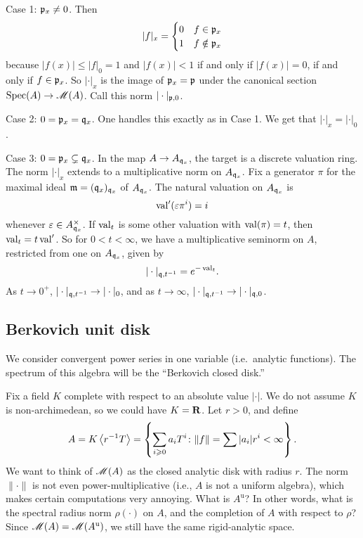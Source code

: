 Case 1: $\mathfrak{p}_x\ne 0$. Then
\[
	|f| _x= \begin{cases} 0 & f\in \mathfrak{p}_x \\ 1 & f\notin \mathfrak{p}_x \end{cases}
\]
because $|f(x)| \leqslant |f|_0 = 1$ and $|f(x)|<1$ if and only if $|f(x)|=0$, 
if and only if $f\in \mathfrak{p}_x$. So $|\cdot|_x$ is the image of $\mathfrak{p}_x=\mathfrak{p}$ under 
the canonical section $\operatorname{Spec}(A)\to \operatorname{\mathscr{M}}(A)$. Call this norm 
$|\cdot|_{\mathfrak{p},0}$. 

Case 2: $0=\mathfrak{p}_x= \mathfrak{q}_x$. One handles this exactly as in Case 1. We get that 
$|\cdot|_x=|\cdot|_0$. 

Case 3: $0=\mathfrak{p}_x\subsetneq \mathfrak{q}_x$. In the map $A\to A_{\mathfrak{q}_x}$, the target is 
a discrete valuation ring. The norm $|\cdot|_x$ extends to a multiplicative 
norm on $A_{\mathfrak{q}_x}$. Fix a generator $\pi$ for the maximal ideal 
$\mathfrak{m}=(\mathfrak{q}_x)_{\mathfrak{q}_x}$ of $A_{\mathfrak{q}_x}$. The natural valuation on $A_{\mathfrak{q}_x}$ is 
\[
	\operatorname{val}'(\varepsilon \pi^i) = i 
\]
whenever $\varepsilon\in A_{\mathfrak{q}_x}^\times$. If $\operatorname{val}_t$ is some other 
valuation with $\operatorname{val}(\pi)=t$, then $\operatorname{val}_t=t\operatorname{val}'$. So for 
$0<t<\infty$, we have a multiplicative seminorm on $A$, restricted from one on 
$A_{\mathfrak{q}_x}$, given by 
\[
	|\cdot|_{\mathfrak{q},t^{-1}} = e^{-\operatorname{val}_t} .
\]
As $t\to 0^+$, $|\cdot|_{\mathfrak{q},t^{-1}}\to |\cdot|_0$, and as $t\to \infty$, 
$|\cdot|_{\mathfrak{q},t^{-1}} \to |\cdot|_{\mathfrak{q},0}$. 





\subsection{Berkovich unit disk}

We consider convergent power series in one variable (i.e.~analytic functions). 
The spectrum of this algebra will be the ``Berkovich closed disk.''

Fix a field $K$ complete with respect to an absolute value $|\cdot|$. We do not 
assume $K$ is non-archimedean, so we could have $K=\mathbf{R}$. Let $r>0$, and define 
\[
	A = K\left\langle r^{-1} T \right\rangle = \left\{\sum_{i\geqslant 0} a_i T^i\colon \|f\| = \sum |a_i| r^i < \infty \right\} .
\]
We want to think of $\operatorname{\mathscr{M}}(A)$ as the closed analytic disk with radius $r$. 
The norm $\|\cdot\|$ is not even power-multiplicative (i.e., $A$ is not a 
uniform algebra), which makes certain computations very annoying. What is 
$A^\mathrm{u}$? In other words, what is the spectral radius norm $\rho(\cdot)$ 
on $A$, and the completion of $A$ with respect to $\rho$? Since 
$\operatorname{\mathscr{M}}(A)=\operatorname{\mathscr{M}}(A^\mathrm{u})$, we still have the same rigid-analytic 
space. 

